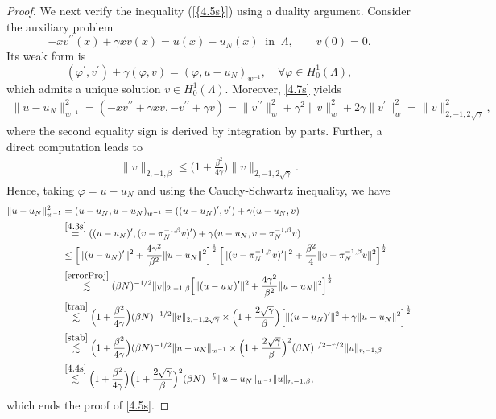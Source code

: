 \documentclass[10pt,reqno]{amsart}
\theoremstyle{remark}
\theoremstyle{definition}
\begin{document}
\begin{proof}
We next verify the inequality {{\rm (\ref{{4.5s}})}} using a duality
argument. Consider the
auxiliary problem
\begin{equation}\label{4.7s}
-xv^{\prime\prime}(x)+\gamma xv(x)=u(x)-u_{N}(x)~ \text{ in }~ \Lambda, \qquad v(0) = 0. 
\end{equation}
Its weak form is
$$(\varphi^\prime,v^\prime)+\gamma(\varphi,v)=(\varphi,u-u_N)_{w^{-1}},\quad \forall \varphi \in H^{1}_{0}(\Lambda),$$
which admits a unique solution $v\in H_0^1(\Lambda)$.
Moreover, \eqref{4.7s} yields
\begin{align}
\label{stab} \|u-u_{N}\|_{w^{-1}}^2 = (-xv^{\prime\prime}+\gamma xv,
-v^{\prime\prime}+\gamma v ) = \|v^{\prime\prime}\|_{w}^2 + \gamma^2
\|v\|_{w}^2 + 2\gamma
\|v^{\prime}\|_{w}^2=\|v\|^2_{2,-1,2\sqrt{\gamma}},
\end{align}
where the second equality sign is derived by integration by parts.
Further, a direct computation leads to
\begin{align}
\label{tran}\|v\|_{2,-1,\beta}\leq\Big(1+\frac{\beta^2}{4\gamma} \Big) \|v\|_{2,-1,2\sqrt{\gamma}}.\end{align}
Hence, taking $\varphi=u-u_{N}$ and using the Cauchy-Schwartz inequality, we have
\begin{align}\label{errs}
\|u-u_{N} \|_{w^{-1}}^2&=(u-u_{N},u-u_{N})_{w^{-1}} =
((u-u_{N})^\prime,v^\prime)+\gamma (u-u_{N},v)\nonumber
\\
&\overset{\eqref{4.3s}}=((u-u_{N})^\prime,(v-\pi^{-1,\beta}_Nv)^\prime)+\gamma
(u-u_{N},v-\pi^{-1,\beta}_Nv)\nonumber
\\
&\le \Big[ \|(u-u_{N})^\prime\|^2  + \frac{4\gamma^2}{\beta^2}\|
u-u_{N}\|^2\Big]^{\frac12} \,  \Big[
\|(v-\pi^{-1,\beta}_Nv)^\prime\|^2 + \frac{\beta^2}{4}
\|v-\pi^{-1,\beta}_Nv\|^2 \Big]^{\frac12}\nonumber
\\
& \overset{\eqref{errorProj}}\lesssim   (\beta N)^{-1/2}  \|v\|_{2,-1,\beta} \Big[ \|(u-u_{N})^\prime\|^2  + \frac{4\gamma^2}{\beta^2}\| u-u_{N}\|^2\Big]^{\frac12}
\\
&\overset{\eqref{tran}} \lesssim  \Big(1+\frac{\beta^2}{4\gamma} \Big)  (\beta N)^{-1/2}  \|v\|_{2,-1,2\sqrt{\gamma}}\times \Big(1+\frac{2\sqrt{\gamma}}{\beta}\Big)  \Big[ \|(u-u_{N})^\prime\|^2  + \gamma\| u-u_{N}\|^2\Big]^{\frac12}
\nonumber\\
&\overset{\eqref{stab}}\lesssim  \Big(1+\frac{\beta^2}{4\gamma}
\Big)
 (\beta N)^{-1/2} \|u-u_{N}\|_{w^{-1}} \times  \Big(1+\frac{2\sqrt{\gamma}}{\beta}\Big)^2  (\beta N)^{1/2-r/2}   \|u\|_{r,-1,\beta}
\nonumber\\
& \overset{\eqref{4.4s}} \lesssim   \Big(1+\frac{\beta^2}{4\gamma}
\Big) \Big(1+\frac{2\sqrt{\gamma}}{\beta}\Big)^2    (\beta
N)^{-\frac{r}{2}}  \|u-u_{N}\|_{w^{-1}}
\|u\|_{r,-1,\beta},\nonumber
\end{align}
which ends the proof of \eqref{4.5s}.
\end{proof}
\end{document}
